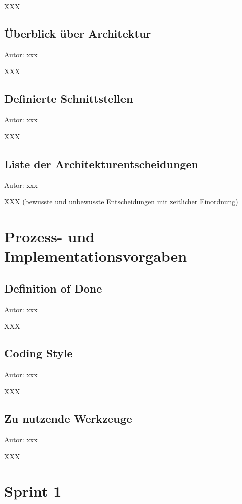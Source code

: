 \documentclass[twoside]{report}
\begin{document}
XXX

\subsection{Überblick über Architektur}
{\small Autor: xxx}

XXX

\subsection{Definierte Schnittstellen}
{\small Autor: xxx}

XXX

\subsection{Liste der Architekturentscheidungen}
{\small Autor: xxx}

XXX (bewusste und unbewusste Entscheidungen mit zeitlicher Einordnung)



\section{Prozess- und Implementationsvorgaben}

\subsection{Definition of Done}
{\small Autor: xxx}

XXX

\subsection{Coding Style}
{\small Autor: xxx}

XXX

\subsection{Zu nutzende Werkzeuge}
{\small Autor: xxx}

XXX

\newpage


\section{Sprint 1}


\end{document}
